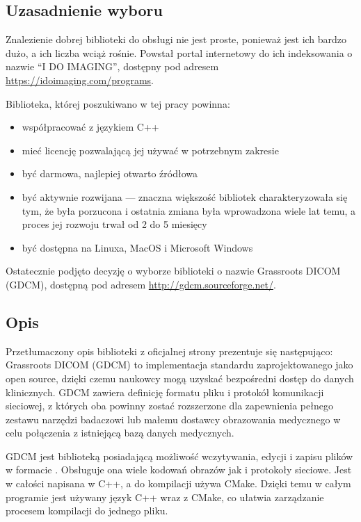 

\subsection{Uzasadnienie wyboru}

\par
Znalezienie dobrej biblioteki do obsługi nie jest proste, ponieważ jest ich bardzo dużo, a ich liczba wciąż rośnie.
Powstał portal internetowy do ich indeksowania o nazwie \enquote{I DO IMAGING}, dostępny pod adresem \url{https://idoimaging.com/programs}.
\par
Biblioteka, której poszukiwano w tej pracy powinna:
\begin{itemize}
    \item współpracować z językiem C++
    \item mieć licencję pozwalającą jej używać w potrzebnym zakresie
    \item być darmowa, najlepiej otwarto źródłowa
    \item być aktywnie rozwijana --- znaczna większość bibliotek charakteryzowała się tym, że była porzucona i ostatnia zmiana była wprowadzona wiele lat temu, a proces jej rozwoju trwał od 2 do 5 miesięcy
    \item być dostępna na Linuxa, MacOS i Microsoft Windows
\end{itemize}
Ostatecznie podjęto decyzję o wyborze biblioteki o nazwie Grassroots DICOM (GDCM), dostępną pod adresem \url{http://gdcm.sourceforge.net/}.

\subsection{Opis}

\par
Przetłumaczony opis biblioteki z oficjalnej strony prezentuje się następująco:
Grassroots DICOM (GDCM) to implementacja standardu \DICOM zaprojektowanego jako open source, dzięki czemu naukowcy mogą uzyskać bezpośredni dostęp do danych klinicznych.
GDCM zawiera definicję formatu pliku i protokół komunikacji sieciowej, z których oba powinny zostać rozszerzone dla zapewnienia pełnego zestawu narzędzi badaczowi lub małemu dostawcy obrazowania medycznego w celu połączenia z istniejącą bazą danych medycznych.

\par
GDCM jest biblioteką posiadającą możliwość wczytywania, edycji i zapisu plików w formacie \DICOM.
Obsługuje ona wiele kodowań obrazów jak i protokoły sieciowe.
Jest w całości napisana w C++, a do kompilacji używa CMake.
Dzięki temu w całym programie jest używany język C++ wraz z CMake, co ułatwia zarządzanie procesem kompilacji do jednego pliku.

